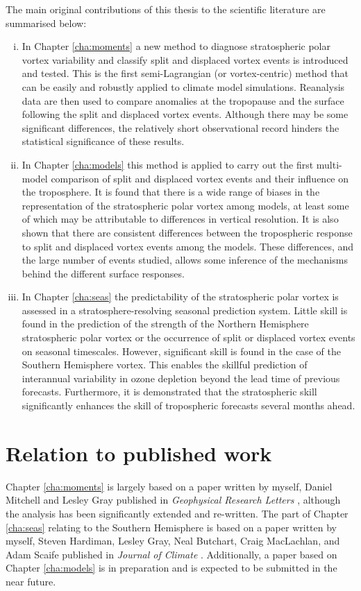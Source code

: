 The main original contributions of this thesis to the scientific literature are
summarised below:
\begin{enumerate}[i.]
\item In Chapter \ref{cha:moments} a new method to diagnose stratospheric polar
  vortex variability and classify split and displaced vortex events is
  introduced and tested. This is the first semi-Lagrangian (or vortex-centric)
  method that can be easily and robustly applied to climate model
  simulations. Reanalysis data are then used to compare anomalies at the
  tropopause and the surface following the split and displaced vortex
  events. Although there may be some significant differences, the relatively
  short observational record hinders the statistical significance of these
  results.

\item In Chapter \ref{cha:models} this method is applied to carry out the first
  multi-model comparison of split and displaced vortex events and their
  influence on the troposphere. It is found that there is a wide range of biases
  in the representation of the stratospheric polar vortex among models, at least
  some of which may be attributable to differences in vertical resolution. It is
  also shown that there are consistent differences between the tropospheric
  response to split and displaced vortex events among the models. These
  differences, and the large number of events studied, allows some inference of
  the mechanisms behind the different surface responses.

\item In Chapter \ref{cha:seas} the predictability of the stratospheric polar
  vortex is assessed in a stratosphere-resolving seasonal prediction
  system. Little skill is found in the prediction of the strength of the
  Northern Hemisphere stratospheric polar vortex or the occurrence of split or
  displaced vortex events on seasonal timescales. However, significant skill is
  found in the case of the Southern Hemisphere vortex. This enables the skillful
  prediction of interannual variability in ozone depletion beyond the lead time
  of previous forecasts. Furthermore, it is demonstrated that the stratospheric
  skill significantly enhances the skill of tropospheric forecasts several
  months ahead.

\end{enumerate}

\section{Relation to published work}
Chapter \ref{cha:moments} is largely based on a paper written by myself, Daniel
Mitchell and Lesley Gray published in \emph{Geophysical Research Letters}
\citep{Seviour2013}, although the analysis has been significantly extended and
re-written. The part of Chapter \ref{cha:seas} relating to the Southern
Hemisphere is based on a paper written by myself, Steven Hardiman, Lesley Gray,
Neal Butchart, Craig MacLachlan, and Adam Scaife published in \emph{Journal of
  Climate} \citep{Seviour2014}. Additionally, a paper based on Chapter
\ref{cha:models} is in preparation and is expected to be submitted in the near
future.

